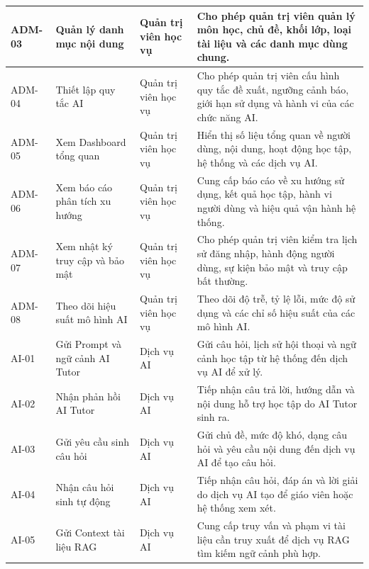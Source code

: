 \documentclass[12pt,a4paper,oneside]{report}
\begin{document}
\begin{longtable}{|p{}|p{}|p{}|p{}|}
ADM-03 &
Quản lý danh mục nội dung &
Quản trị viên học vụ &
Cho phép quản trị viên quản lý môn học, chủ đề, khối lớp, loại tài liệu và các danh mục dùng chung. \\
\hline

ADM-04 &
Thiết lập quy tắc AI &
Quản trị viên học vụ &
Cho phép quản trị viên cấu hình quy tắc đề xuất, ngưỡng cảnh báo, giới hạn sử dụng và hành vi của các chức năng AI. \\
\hline

ADM-05 &
Xem Dashboard tổng quan &
Quản trị viên học vụ &
Hiển thị số liệu tổng quan về người dùng, nội dung, hoạt động học tập, hệ thống và các dịch vụ AI. \\
\hline

ADM-06 &
Xem báo cáo phân tích xu hướng &
Quản trị viên học vụ &
Cung cấp báo cáo về xu hướng sử dụng, kết quả học tập, hành vi người dùng và hiệu quả vận hành hệ thống. \\
\hline

ADM-07 &
Xem nhật ký truy cập và bảo mật &
Quản trị viên học vụ &
Cho phép quản trị viên kiểm tra lịch sử đăng nhập, hành động người dùng, sự kiện bảo mật và truy cập bất thường. \\
\hline

ADM-08 &
Theo dõi hiệu suất mô hình AI &
Quản trị viên học vụ &
Theo dõi độ trễ, tỷ lệ lỗi, mức độ sử dụng và các chỉ số hiệu suất của các mô hình AI. \\
\hline

AI-01 &
Gửi Prompt và ngữ cảnh AI Tutor &
Dịch vụ AI &
Gửi câu hỏi, lịch sử hội thoại và ngữ cảnh học tập từ hệ thống đến dịch vụ AI để xử lý. \\
\hline

AI-02 &
Nhận phản hồi AI Tutor &
Dịch vụ AI &
Tiếp nhận câu trả lời, hướng dẫn và nội dung hỗ trợ học tập do AI Tutor sinh ra. \\
\hline

AI-03 &
Gửi yêu cầu sinh câu hỏi &
Dịch vụ AI &
Gửi chủ đề, mức độ khó, dạng câu hỏi và yêu cầu nội dung đến dịch vụ AI để tạo câu hỏi. \\
\hline

AI-04 &
Nhận câu hỏi sinh tự động &
Dịch vụ AI &
Tiếp nhận câu hỏi, đáp án và lời giải do dịch vụ AI tạo để giáo viên hoặc hệ thống xem xét. \\
\hline

AI-05 &
Gửi Context tài liệu RAG &
Dịch vụ AI &
Cung cấp truy vấn và phạm vi tài liệu cần truy xuất để dịch vụ RAG tìm kiếm ngữ cảnh phù hợp. \\
\hline


\end{longtable}
\end{document}
